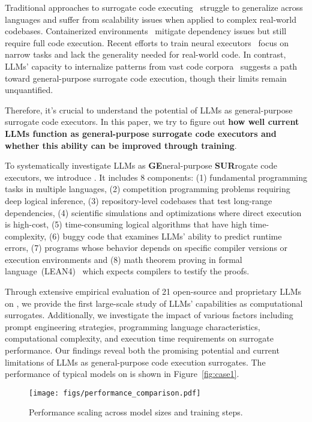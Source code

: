 Traditional approaches to surrogate code executing~\citep{10.1145/360248.360252, 10.1145/2408776.2408795} struggle to generalize across languages and suffer from scalability issues when applied to complex real-world codebases. Containerized environments~\citep{10.5555/2600239.2600241} mitigate dependency issues but still require full code execution. Recent efforts to train neural executors~\citep{yan2020neuralexecutionengineslearning} focus on narrow tasks and lack the generality needed for real-world code. In contrast, LLMs’ capacity to internalize patterns from vast code corpora~\citep{CodeXGLUE, codealpaca} suggests a path toward general-purpose surrogate code execution, though their limits remain unquantified. 

Therefore, it's crucial to understand the potential of LLMs as general-purpose surrogate code executors. In this paper, we try to figure out \textbf{how well current LLMs function as general-purpose surrogate code executors and whether this ability can be improved through training}.

To systematically investigate LLMs as \textbf{GE}neral-purpose \textbf{SUR}rogate code executors, we introduce \textbf{\bench}. It includes $8$ components: (1) fundamental programming tasks in multiple languages, (2) competition programming problems requiring deep logical inference, (3) repository-level codebases that test long-range dependencies, (4) scientific simulations and optimizations where direct execution is high-cost, (5) time-consuming logical algorithms that have high time-complexity, (6) buggy code that examines LLMs' ability to predict runtime errors, (7) programs whose behavior depends on specific compiler versions or execution environments and (8) math theorem proving in formal language~(LEAN4)~\citep{de2015lean, moura2021lean} which expects compilers to testify the proofs.

Through extensive empirical evaluation of 21 open-source and proprietary LLMs on \bench, we provide the first large-scale study of LLMs' capabilities as computational surrogates. Additionally, we investigate the impact of various factors including prompt engineering strategies, programming language characteristics, computational complexity, and execution time requirements on surrogate performance. Our findings reveal both the promising potential and current limitations of LLMs as general-purpose code execution surrogates. The performance of typical models on \bench is shown in Figure~\ref{fig:case1}.

\begin{figure}[!t]
    \centering
    \texttt{[image: figs/performance\_comparison.pdf]}
    \caption{Performance scaling across model sizes and training steps.}
    \label{fig:case2}
\end{figure}

